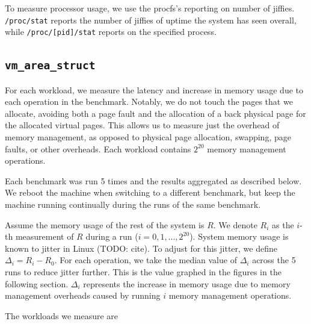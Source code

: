 \documentclass[twocolumn,11pt]{article}
\begin{document}
To measure processor usage, we use the procfs's reporting on number of jiffies.
\texttt{/proc/stat} reports the number of jiffies of uptime the system has seen
overall, while \texttt{/proc/[pid]/stat} reports on the specified process.

\subsection{\texttt{vm\_area\_struct}}
\label{ss_vm_area_struct}

For each workload, we measure the latency and increase in memory usage due to
each operation in the benchmark. Notably, we do not touch the pages that we
allocate, avoiding both a page fault and the allocation of a back physical page
for the allocated virtual pages. This allows us to measure just the overhead of
memory management, as opposed to physical page allocation, swapping, page
faults, or other overheads.  Each workload contains $2^{20}$ memory management
operations.

Each benchmark was run 5 times and the results aggregated as described below. We
reboot the machine when switching to a different benchmark, but keep the machine
running continually during the runs of the same benchmark. 

Assume the memory usage of the rest of the system is $R$. We denote $R_i$ as the
$i$-th measurement of $R$ during a run ($i = 0, 1, ..., 2^{20}$). System memory
usage is known to jitter in Linux (TODO: cite). To adjust for this jitter, we
define $\Delta_i = R_i - R_0$. For each operation, we take the median value of
$\Delta_i$ across the 5 runs to reduce jitter further.  This is the value
graphed in the figures in the following section. $\Delta_i$ represents the
increase in memory usage due to memory management overheads caused by running
$i$ memory management operations.

The workloads we measure are
\end{document}
